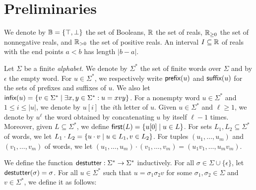 \section{Preliminaries} \label{sec:preliminaries}

%
We denote by $\mathbb{B} = \{ \top, \bot \}$ the set of Booleans, $\mathbb{R}$ the set of reals, $\mathbb{R}_{\geq 0}$ the set of nonnegative reals, and $\mathbb{R}_{> 0}$ the 
set of positive reals.
%
An interval $I \subseteq \mathbb{R}$ of reals with the end points $a < b$ has length $|b-a|$.

Let $\Sigma$ be a finite {\em alphabet}.
%
We denote by $\Sigma^*$ the set of finite words over $\Sigma$ and by $\epsilon$ the empty word.
%
For $u \in \Sigma^*$, we respectively write $\textsf{prefix}(u)$ and $\textsf{suffix}(u)$ for the sets of prefixes 
and suffixes of $u$.
%
We also let $\infx(u) = \{v \in \Sigma^* \st \exists x,y \in \Sigma^* : u = xvy\}$.
%
For a nonempty word $u \in \Sigma^*$ and $1 \leq i \leq |u|$, we denote by $u[i]$ the $i$th letter of $u$.
%
Given $u \in \Sigma^*$ and $\ell \geq 1$, we denote by $u^\ell$ the word obtained by concatenating $u$ by itself $\ell - 1$ times.
Moreover, given $L \subseteq \Sigma^*$, we define $\first(L) = \{ u[0] \st u \in L\}$.
For sets $L_1, L_2 \subseteq \Sigma^*$ of words, we let $L_1 \cdot L_2 = \{u \cdot v \st u \in L_1, v \in L_2\}$.
For tuples $(u_1, \ldots, u_m)$ and $(v_1, \ldots, v_m)$ of words, we let $(u_1, \ldots, u_m) \cdot (v_1, \ldots, v_m) = (u_1 v_1, \ldots, u_m v_m)$.

We define the function $\mathsf{destutter} : \Sigma^* \to \Sigma^*$ inductively.
For all $\sigma \in \Sigma \cup \{\epsilon\}$, let $\mathsf{destutter}(\sigma) = \sigma$.
For all $u \in \Sigma^*$ such that $u = \sigma_1 \sigma_2 v$ for some $\sigma_1,\sigma_2 \in 
\Sigma$ and $v \in \Sigma^*$, we define it as follows:

